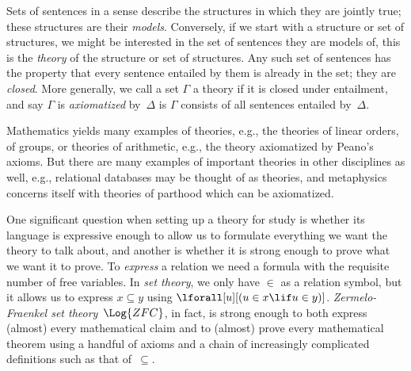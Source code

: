 Sets of sentences in a sense describe the structures in which they are
jointly true; these structures are their \emph{models}.  Conversely,
if we start with a structure or set of structures, we might be
interested in the set of sentences they are models of, this is the
\emph{theory} of the structure or set of structures. Any such set of
sentences has the property that every sentence entailed by them is
already in the set; they are \emph{closed}.  More generally, we call a
set $\Gamma$ a theory if it is closed under entailment, and say
$\Gamma$ is \emph{axiomatized} by~$\Delta$ is $\Gamma$ consists of all
sentences entailed by~$\Delta$.

Mathematics yields many examples of theories, e.g., the theories of
linear orders, of groups, or theories of arithmetic, e.g., the theory
axiomatized by Peano's axioms. But there are many examples of
important theories in other disciplines as well, e.g., relational
databases may be thought of as theories, and metaphysics concerns
itself with theories of parthood which can be axiomatized.

One significant question when setting up a theory for study is whether
its language is expressive enough to allow us to formulate everything
we want the theory to talk about, and another is whether it is strong
enough to prove what we want it to prove.  To \emph{express} a
relation we need a formula with the requisite number of free
variables. In \emph{set theory}, we only have $\in$ as a relation
symbol, but it allows us to express $x \subseteq y$ using
$\lforall[u][(u \in x \lif u \in y)]$. \emph{Zermelo-Fraenkel set
  theory}~$\Log{ZFC}$, in fact, is strong enough to both express
(almost) every mathematical claim and to (almost) prove every
mathematical theorem using a handful of axioms and a chain of
increasingly complicated definitions such as that of~$\subseteq$.
